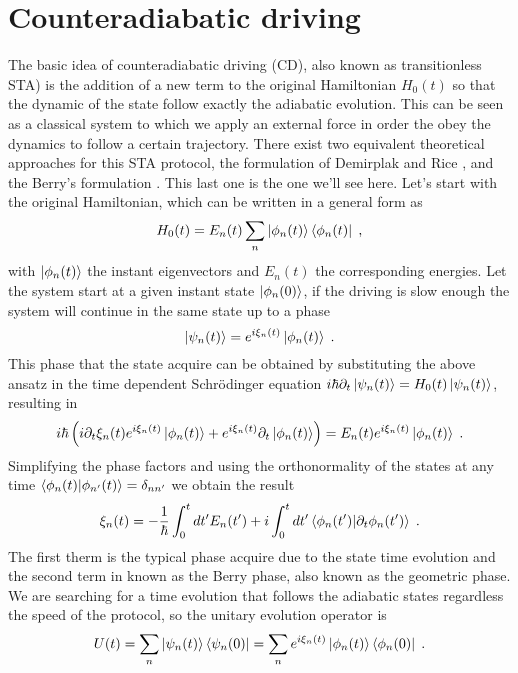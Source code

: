 \section{Counteradiabatic driving}
The basic idea of counteradiabatic driving (CD), also known as transitionless STA) is the addition of a new term to the original Hamiltonian $H_0(t)$ so that the dynamic of the state follow exactly the adiabatic evolution. This can be seen as a classical system to which we apply an external force in order the obey the dynamics to follow a certain trajectory. There exist two equivalent theoretical approaches for this STA protocol, the formulation of Demirplak and Rice \cite{Demirplak2003}, and the Berry's formulation \cite{Berry2009}. This last one is the one we'll see here. Let's start with the original Hamiltonian, which can be written in a general form as
\begin{equation}
	H_0(t)=E_n(t)\sum_n\ket{\phi_n(t)}\bra{\phi_n(t)}\; ,
\end{equation}
with $\ket{\phi_n(t)}$ the instant eigenvectors and $E_n(t)$ the corresponding energies. Let the system start at a given instant state $\ket{\phi_n(0)}$, if the driving is slow enough the system will continue in the same state up to a phase
\begin{equation}
	\ket{\psi_n(t)}=e^{i\xi_n(t)}\ket{\phi_n(t)}\;.
\end{equation}
This phase that the state acquire can be obtained by substituting the above ansatz in the time dependent Schrödinger equation $i\hbar\partial_t\ket{\psi_n(t)}=H_0(t)\ket{\psi_n(t)}$, resulting in
\begin{equation}
	i\hbar\left(i\partial_t\xi_n(t)e^{i\xi_n(t)}\ket{\phi_n(t)}+e^{i\xi_n(t)}\partial_t\ket{\phi_n(t)}\right)=E_n(t)e^{i\xi_n(t)}\ket{\phi_n(t)}\; .
\end{equation}
Simplifying the phase factors and using the orthonormality of the states at any time $\braket{\phi_n(t)}{\phi_{n'}(t)}=\delta_{nn'}$ we obtain the result
\begin{equation}
	\xi_n(t)=-\frac{1}{\hbar}\int_0^tdt'E_n(t')+i\int_0^tdt'\braket{\phi_n(t')}{\partial_t \phi_n(t')}\; .
	\label{eq:Berry_phase}
\end{equation}
The first therm is the typical phase acquire due to the state time evolution and the second term in known as the Berry phase, also known as the geometric phase. We are searching for a time evolution that follows the adiabatic states regardless the speed of the protocol, so the unitary evolution operator is
\begin{equation}
	U(t)=\sum_n\ket{\psi_n(t)}\bra{\psi_n(0)}=\sum_ne^{i\xi_n(t)}\ket{\phi_n(t)}\bra{\phi_n(0)}\; .
\end{equation}

